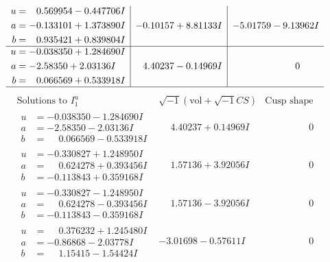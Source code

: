 \documentclass[1p]{elsarticle_modified}
\theoremstyle{definition}
\newcommand{\I}{\sqrt{-1}}
\begin{document}
$$\begin{array}{c|c|c}
\begin{aligned}
u &= \phantom{-}0.569954 - 0.447706 I \\
a &= -0.133101 + 1.373890 I \\
b &= \phantom{-}0.935421 + 0.839804 I\end{aligned}
 & -0.10157 + 8.81133 I & -5.01759 - 9.13962 I \\ \hline\begin{aligned}
u &= -0.038350 + 1.284690 I \\
a &= -2.58350 + 2.03136 I \\
b &= \phantom{-}0.066569 + 0.533918 I\end{aligned}
 & \phantom{-}4.40237 - 0.14969 I & \phantom{-0.000000 } 0\\
 \hline 
 \end{array}$$\newpage$$\begin{array}{c|c|c}  
\text{Solutions to }I^u_{1}& \I (\text{vol} + \sqrt{-1}CS) & \text{Cusp shape}\\
 \hline 
\begin{aligned}
u &= -0.038350 - 1.284690 I \\
a &= -2.58350 - 2.03136 I \\
b &= \phantom{-}0.066569 - 0.533918 I\end{aligned}
 & \phantom{-}4.40237 + 0.14969 I & \phantom{-0.000000 } 0 \\ \hline\begin{aligned}
u &= -0.330827 + 1.248950 I \\
a &= \phantom{-}0.624278 + 0.393456 I \\
b &= -0.113843 + 0.359168 I\end{aligned}
 & \phantom{-}1.57136 + 3.92056 I & \phantom{-0.000000 } 0 \\ \hline\begin{aligned}
u &= -0.330827 - 1.248950 I \\
a &= \phantom{-}0.624278 - 0.393456 I \\
b &= -0.113843 - 0.359168 I\end{aligned}
 & \phantom{-}1.57136 - 3.92056 I & \phantom{-0.000000 } 0 \\ \hline\begin{aligned}
u &= \phantom{-}0.376232 + 1.245480 I \\
a &= -0.86868 - 2.03778 I \\
b &= \phantom{-}1.15415 - 1.54424 I\end{aligned}
 & -3.01698 - 0.57611 I & \phantom{-0.000000 } 0 \\ \hline\begin{aligned}

\end{aligned}
\end{array}$$
\end{document}
